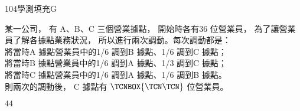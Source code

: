     \begin{QUESTION}
        \begin{ExamInfo}{104}{學測}{填充}{G}
        \end{ExamInfo}
        \begin{ExamAnsRateInfo}{46}{81}{47}{10}
        \end{ExamAnsRateInfo}
        \begin{QBODY}
            某一公司， 有 A、B、C 三個營業據點， 開始時各有36 位營業員， 為了讓營業員了解各據點業務狀況， 所以進行兩次調動。每次調動都是：\\
			將當時A 據點營業員中的1/6 調到B 據點、1/6 調到C 據點；\\
			將當時B 據點營業員中的1/6 調到A 據點、1/3 調到C 據點；\\
			將當時C 據點營業員中的1/6 調到A 據點、1/6 調到B 據點。\\
			則兩次的調動後， C 據點有 $\TCNBOX{\TCN\TCN}$ 位營業員。
        \end{QBODY}
        \begin{QFROMS}
        \end{QFROMS}
        \begin{QTAGS}\end{QTAGS}
        \begin{QANS}
            $44$
        \end{QANS}
        \begin{QSOLLIST}
        \end{QSOLLIST}
        \begin{QEMPTYSPACE}
        \end{QEMPTYSPACE}
    \end{QUESTION}
